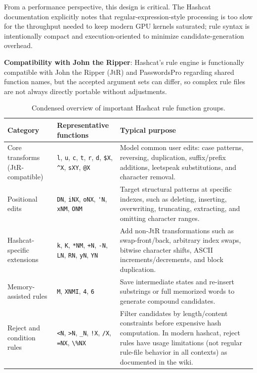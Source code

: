 From a performance perspective, this design is critical. The Hashcat documentation explicitly notes that regular-expression-style processing is too slow for the throughput needed to keep modern GPU kernels saturated; rule syntax is intentionally compact and execution-oriented to minimize candidate-generation overhead.

\textbf{Compatibility with John the Ripper}: Hashcat's rule engine is functionally compatible with John the Ripper (JtR) and PasswordsPro regarding shared function names, but the accepted argument sets can differ, so complex rule files are not always directly portable without adjustments.

\begin{table}[H]
\centering
\caption{Condensed overview of important Hashcat rule function groups.}
\label{tab:hashcat_rule_groups}
\small
\begin{tabular}{|p{3.0cm}|p{5.2cm}|p{5.2cm}|}
\hline
\textbf{Category} & \textbf{Representative functions} & \textbf{Typical purpose} \\\hline
Core transforms (JtR-compatible) & \verb|l|, \verb|u|, \verb|c|, \verb|t|, \verb|r|, \verb|d|, \verb|$X|, \verb|^X|, \verb|sXY|, \verb|@X| & Model common user edits: case patterns, reversing, duplication, suffix/prefix additions, leetspeak substitutions, and character removal. \\\hline
Positional edits & \verb|DN|, \verb|iNX|, \verb|oNX|, \verb|'N|, \verb|xNM|, \verb|ONM| & Target structural patterns at specific indexes, such as deleting, inserting, overwriting, truncating, extracting, and omitting character ranges. \\\hline
Hashcat-specific extensions & \verb|k|, \verb|K|, \verb|*NM|, \verb|+N|, \verb|-N|, \verb|LN|, \verb|RN|, \verb|yN|, \verb|YN| & Add non-JtR transformations such as swap-front/back, arbitrary index swaps, bitwise character shifts, ASCII increments/decrements, and block duplication. \\\hline
Memory-assisted rules & \verb|M|, \verb|XNMI|, \verb|4|, \verb|6| & Save intermediate states and re-insert substrings or full memorized words to generate compound candidates. \\\hline
Reject and condition rules & \verb|<N|, \verb|>N|, \verb|_N|, \verb|!X|, \verb|/X|, \verb|=NX|, \verb|\%NX| & Filter candidates by length/content constraints before expensive hash computation. In modern hashcat, reject rules have usage limitations (not regular rule-file behavior in all contexts) as documented in the wiki. \\\hline
\end{tabular}
\normalsize
\end{table}

